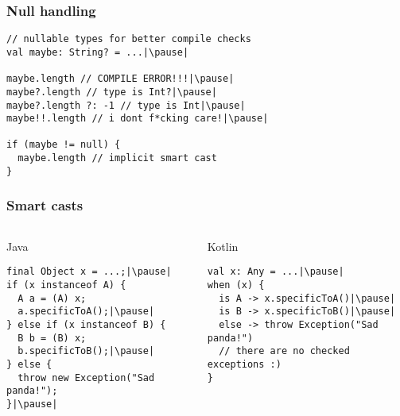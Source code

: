 
\begin{withoutheadline}
\end{withoutheadline}

\begin{frame}[fragile] \frametitle{Null handling}
\pause
\begin{lstlisting}
// nullable types for better compile checks
val maybe: String? = ...|\pause|

maybe.length // COMPILE ERROR!!!|\pause|
maybe?.length // type is Int?|\pause|
maybe?.length ?: -1 // type is Int|\pause|
maybe!!.length // i dont f*cking care!|\pause|

if (maybe != null) {
  maybe.length // implicit smart cast
}
\end{lstlisting}
\end{frame}



\begin{frame}[fragile]
\frametitle{Smart casts}
\pause
\begin{columns}[t]
\begin{column}{0.5\textwidth}
\begin{center}
  Java
\end{center}
\begin{lstlisting}[style=twosided]
final Object x = ...;|\pause|
if (x instanceof A) {
  A a = (A) x;
  a.specificToA();|\pause|
} else if (x instanceof B) {
  B b = (B) x;
  b.specificToB();|\pause|
} else {
  throw new Exception("Sad panda!");
}|\pause|
\end{lstlisting}
\end{column}
\begin{column}{0.5\textwidth}
\begin{center}
  Kotlin
\end{center}
\begin{lstlisting}[style=twosided]
val x: Any = ...|\pause|
when (x) {
  is A -> x.specificToA()|\pause|
  is B -> x.specificToB()|\pause|
  else -> throw Exception("Sad panda!")
  // there are no checked exceptions :)
}
\end{lstlisting}
\end{column}
\end{columns}
\end{frame}


